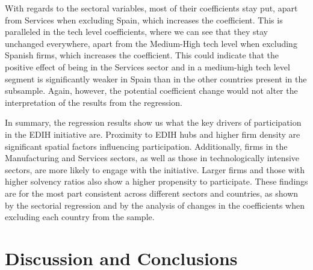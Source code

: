 \documentclass[12pt]{report}
\begin{document}
\par With regards to the sectoral variables, most of their coefficients stay put, apart from Services when excluding Spain, which increases the coefficient. This is paralleled in the tech level coefficients, where we can see that they stay unchanged everywhere, apart from the Medium-High tech level when excluding Spanish firms, which increases the coefficient. This could indicate that the positive effect of being in the Services sector and in a medium-high tech level segment is significantly weaker in Spain than in the other countries present in the subsample. Again, however, the potential coefficient change would not alter the interpretation of the results from the regression.

\par In summary, the regression results show us what the key drivers of participation in the EDIH initiative are. Proximity to EDIH hubs and higher firm density are significant spatial factors influencing participation. Additionally, firms in the Manufacturing and Services sectors, as well as those in technologically intensive sectors, are more likely to engage with the initiative. Larger firms and those with higher solvency ratios also show a higher propensity to participate. These findings are for the most part consistent across different sectors and countries, as shown by the sectorial regression and by the analysis of changes in the coefficients when excluding each country from the sample.




\newpage
\chapter{Discussion and Conclusions}
\end{document}
